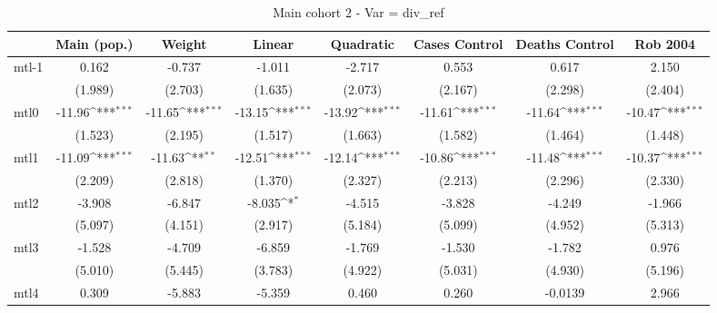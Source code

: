 \documentclass{article}
\begin{document}
{
\def\sym#1{\ifmmode^{#1}\else\(^{#1}\)\fi}
\begin{longtable}{l*{7}{c}}
\caption{Main cohort 2 - Var = div\_ref}\\
\hline\hline\endfirsthead\hline\endhead\hline\endfoot\endlastfoot
                &\multicolumn{1}{c}{Main (pop.)}&\multicolumn{1}{c}{Weight}&\multicolumn{1}{c}{Linear}&\multicolumn{1}{c}{Quadratic}&\multicolumn{1}{c}{Cases Control}&\multicolumn{1}{c}{Deaths Control}&\multicolumn{1}{c}{Rob 2004}\\
\hline
mtl-1           &    0.162         &   -0.737         &   -1.011         &   -2.717         &    0.553         &    0.617         &    2.150         \\
                &  (1.989)         &  (2.703)         &  (1.635)         &  (2.073)         &  (2.167)         &  (2.298)         &  (2.404)         \\
mtl0            &   -11.96\sym{***}&   -11.65\sym{***}&   -13.15\sym{***}&   -13.92\sym{***}&   -11.61\sym{***}&   -11.64\sym{***}&   -10.47\sym{***}\\
                &  (1.523)         &  (2.195)         &  (1.517)         &  (1.663)         &  (1.582)         &  (1.464)         &  (1.448)         \\
mtl1            &   -11.09\sym{***}&   -11.63\sym{**} &   -12.51\sym{***}&   -12.14\sym{***}&   -10.86\sym{***}&   -11.48\sym{***}&   -10.37\sym{***}\\
                &  (2.209)         &  (2.818)         &  (1.370)         &  (2.327)         &  (2.213)         &  (2.296)         &  (2.330)         \\
mtl2            &   -3.908         &   -6.847         &   -8.035\sym{*}  &   -4.515         &   -3.828         &   -4.249         &   -1.966         \\
                &  (5.097)         &  (4.151)         &  (2.917)         &  (5.184)         &  (5.099)         &  (4.952)         &  (5.313)         \\
mtl3            &   -1.528         &   -4.709         &   -6.859         &   -1.769         &   -1.530         &   -1.782         &    0.976         \\
                &  (5.010)         &  (5.445)         &  (3.783)         &  (4.922)         &  (5.031)         &  (4.930)         &  (5.196)         \\
mtl4            &    0.309         &   -5.883         &   -5.359         &    0.460         &    0.260         &  -0.0139         &    2.966         \\

\end{longtable}}
\end{document}
